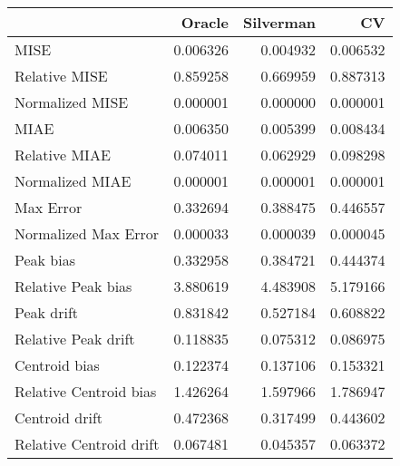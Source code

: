 \begin{tabular}{lrrr}
  \hline
 & Oracle & Silverman & CV \\ 
  \hline
MISE & 0.006326 & 0.004932 & 0.006532 \\ 
  Relative MISE & 0.859258 & 0.669959 & 0.887313 \\ 
  Normalized MISE & 0.000001 & 0.000000 & 0.000001 \\ 
  MIAE & 0.006350 & 0.005399 & 0.008434 \\ 
  Relative MIAE & 0.074011 & 0.062929 & 0.098298 \\ 
  Normalized MIAE & 0.000001 & 0.000001 & 0.000001 \\ 
  Max Error & 0.332694 & 0.388475 & 0.446557 \\ 
  Normalized Max Error & 0.000033 & 0.000039 & 0.000045 \\ 
  Peak bias & 0.332958 & 0.384721 & 0.444374 \\ 
  Relative Peak bias & 3.880619 & 4.483908 & 5.179166 \\ 
  Peak drift & 0.831842 & 0.527184 & 0.608822 \\ 
  Relative Peak drift & 0.118835 & 0.075312 & 0.086975 \\ 
  Centroid bias & 0.122374 & 0.137106 & 0.153321 \\ 
  Relative Centroid bias & 1.426264 & 1.597966 & 1.786947 \\ 
  Centroid drift & 0.472368 & 0.317499 & 0.443602 \\ 
  Relative Centroid drift & 0.067481 & 0.045357 & 0.063372 \\ 
   \hline
\end{tabular}
